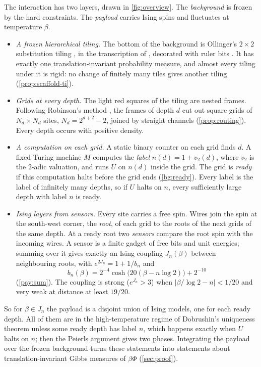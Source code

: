 The interaction has two layers, drawn in \cref{fig:overview}. The \emph{background} is frozen by the hard constraints. The \emph{payload} carries Ising spins and fluctuates at temperature $\beta$.

\begin{itemize}
\item \emph{A frozen hierarchical tiling.} The bottom of the background is Ollinger's $2\times2$ substitution tiling \cite{Ollinger08}, in the transcription of \cite{LeanWang}, decorated with ruler bits \cite{DM26forget}. It has exactly one translation-invariant probability measure, and almost every tiling under it is rigid: no change of finitely many tiles gives another tiling (\cref{prop:scaffold-ti}).
\item \emph{Grids at every depth.} The light red squares of the tiling are nested frames. Following Robinson's method \cite{Robinson71}, the frames of depth $d$ cut out square grids of $N_d\times N_d$ sites, $N_d=2^{d+2}-2$, joined by straight channels (\cref{prop:routing}). Every depth occurs with positive density.
\item \emph{A computation on each grid.} A static binary counter on each grid finds $d$. A fixed Turing machine $M$ computes the \emph{label} $n(d)=1+v_2(d)$, where $v_2$ is the $2$-adic valuation, and runs $U$ on $n(d)$ inside the grid. The grid is \emph{ready} if this computation halts before the grid ends (\cref{bg:ready}). Every label is the label of infinitely many depths, so if $U$ halts on $n$, every sufficiently large depth with label $n$ is ready.
\item \emph{Ising layers from sensors.} Every site carries a free spin. Wires join the spin at the south-west corner, the \emph{root}, of each grid to the roots of the next grids of the same depth. At a ready root two \emph{sensors} compare the root spin with the incoming wires. A sensor is a finite gadget of free bits and unit energies; summing over it gives exactly an Ising coupling $J_n(\beta)$ between neighbouring roots, with $e^{2J_n}=1+1/b_n$ and
\[
b_n(\beta)=2^{-4}\cosh\bigl(20(\beta-n\log2)\bigr)+2^{-10}
\]
(\cref{pay:sum}). The coupling is strong ($e^{J_n}>3$) when $|\beta/\log2-n|<1/20$ and very weak at distance at least $19/20$.
\end{itemize}

So for $\beta\in J_n$ the payload is a disjoint union of Ising models, one for each ready depth. All of them are in the high-temperature regime of Dobrushin's uniqueness theorem unless some ready depth has label $n$, which happens exactly when $U$ halts on $n$; then the Peierls argument gives two phases. Integrating the payload over the frozen background turns these statements into statements about translation-invariant Gibbs measures of $\beta\Phi$ (\cref{sec:proof}).

